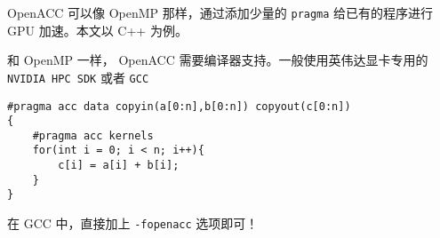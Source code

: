 
\begin{issues}
\issueDraft
\end{issues}

OpenACC 可以像 OpenMP 那样，通过添加少量的 \verb`pragma` 给已有的程序进行 GPU 加速。本文以 C++ 为例。

和 OpenMP 一样， OpenACC 需要编译器支持。一般使用英伟达显卡专用的 \verb`NVIDIA HPC SDK` 或者 \verb`GCC`

\begin{lstlisting}[language=none]
#pragma acc data copyin(a[0:n],b[0:n]) copyout(c[0:n])
{
    #pragma acc kernels 
    for(int i = 0; i < n; i++){
        c[i] = a[i] + b[i];
    }
}
\end{lstlisting}

在 GCC 中，直接加上 \verb`-fopenacc` 选项即可！
